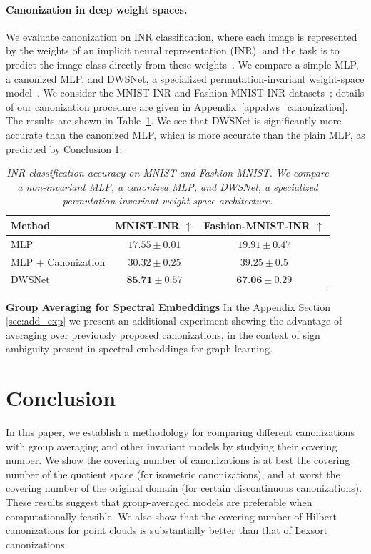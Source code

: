 \documentclass{article}
\begin{document}
\paragraph{Canonization in deep weight spaces.}
We evaluate canonization on INR classification, where each image is represented by the weights of an implicit neural representation (INR), and the task is to predict the image class directly from these weights~\citep{pmlr-v202-navon23a}. We compare a simple MLP, 
a canonized MLP, and DWSNet, a specialized permutation-invariant weight-space model~\citep{pmlr-v202-navon23a}. We consider the MNIST-INR and Fashion-MNIST-INR datasets~\citep{pmlr-v202-navon23a}; details of our canonization procedure are given in Appendix~\ref{app:dws_canonization}. The results are shown in Table~\ref{tab:dws_canonization}. We see that DWSNet is significantly more accurate than the canonized MLP, which is more accurate than the plain MLP, as predicted by Conclusion 1.
\begin{table}[h]
\centering
\caption{\it INR classification accuracy on MNIST and Fashion-MNIST.
We compare a non-invariant MLP,  a canonized MLP, and DWSNet, a specialized
permutation-invariant weight-space architecture.}
\label{tab:dws_canonization}
\begin{tabular}{lcc}
\toprule
\textbf{Method}
& \textbf{MNIST-INR} $\uparrow$
& \textbf{Fashion-MNIST-INR} $\uparrow$ \\
\midrule
MLP
& $17.55 \pm 0.01$
& $19.91 \pm 0.47$ \\
MLP + Canonization
& $30.32 \pm 0.25$

& $39.25 \pm 0.5$
 \\
DWSNet
& $\textbf{85.71} \pm 0.57$
& $\textbf{67.06} \pm 0.29$ \\
\bottomrule
\end{tabular}
\end{table}

\textbf{Group Averaging for Spectral Embeddings} In the Appendix
 Section \ref{sec:add_exp} we present an additional experiment showing the advantage of averaging over previously proposed canonizations, in the context of sign ambiguity present in spectral embeddings for graph learning. 

 
\section{Conclusion}
In this paper, we establish a methodology for comparing different canonizations with group averaging and other invariant models by studying their covering number. We show the covering number of canonizations is at best the covering number of the quotient space (for isometric canonizations), and at worst the covering number of the original domain (for certain discontinuous canonizations). These results suggest that group-averaged models are preferable when computationally feasible. We also show that the covering number of Hilbert canonizations for point clouds is substantially better than that of Lexsort canonizations. 
\end{document}
